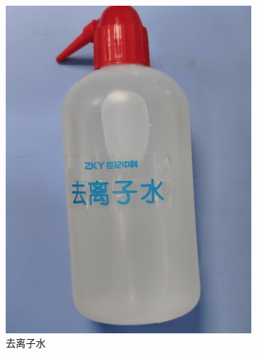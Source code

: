 \documentclass[a4paper]{report} %
\begin{document}
\begin{figure}[htbp]
\begin{subfigure}{0.22\textwidth}
        \includegraphics[width=\linewidth]{去离子水.jpg}
        \caption{去离子水}
    \end{subfigure}
    \begin{subfigure}{0.22\textwidth}

\end{subfigure}
\end{figure}
\end{document}
